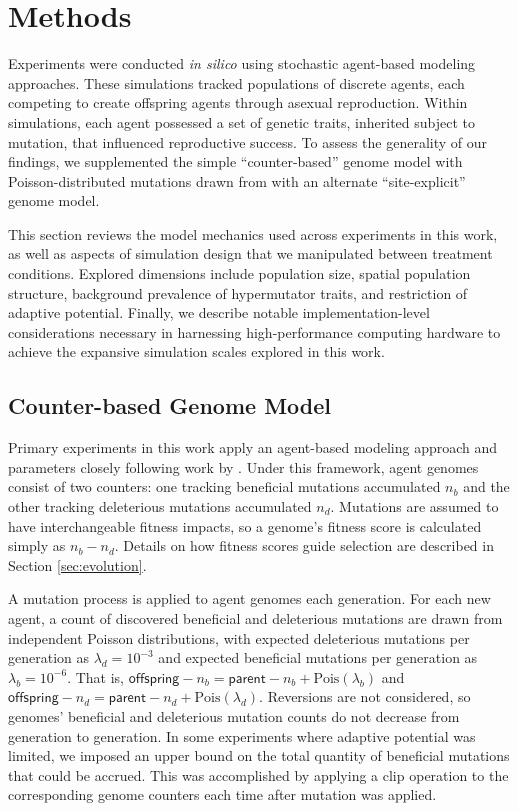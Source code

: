 \section{Methods} \label{sec:methods}

Experiments were conducted \textit{in silico} using stochastic agent-based modeling approaches.
These simulations tracked populations of discrete agents, each competing to create offspring agents through asexual reproduction.
Within simulations, each agent possessed a set of genetic traits, inherited subject to mutation, that influenced reproductive success.
To assess the generality of our findings, we supplemented the simple ``counter-based'' genome model with Poisson-distributed mutations drawn from \cite{raynes2018sign} with an alternate ``site-explicit'' genome model.

This section reviews the model mechanics used across experiments in this work, as well as aspects of simulation design that we manipulated between treatment conditions.
Explored dimensions include population size, spatial population structure, background prevalence of hypermutator traits, and restriction of adaptive potential.
Finally, we describe notable implementation-level considerations necessary in harnessing high-performance computing hardware to achieve the expansive simulation scales explored in this work.

\subsection{Counter-based Genome Model} \label{sec:poisson}

Primary experiments in this work apply an agent-based modeling approach and parameters closely following work by \cite{raynes2018sign}.
Under this framework, agent genomes consist of two counters: one tracking beneficial mutations accumulated $n_b$ and the other tracking deleterious mutations accumulated $n_d$.
Mutations are assumed to have interchangeable fitness impacts, so a genome’s fitness score is calculated simply as $n_b - n_d$.
Details on how fitness scores guide selection are described in Section \ref{sec:evolution}.

A mutation process is applied to agent genomes each generation.
For each new agent, a count of discovered beneficial and deleterious mutations are drawn from independent Poisson distributions, with expected deleterious mutations per generation as
$\lambda_d=10^{-3}$ and expected beneficial mutations per generation as $\lambda_b=10^{-6}$.
That is, $\mathsf{offspring-}n_b = \mathsf{parent-}n_b + \mathrm{Pois}(\lambda_b)$ and $\mathsf{offspring-}n_d = \mathsf{parent-}n_d + \mathrm{Pois}(\lambda_d)$.
Reversions are not considered, so genomes' beneficial and deleterious mutation counts do not decrease from generation to generation.
In some experiments where adaptive potential was limited, we imposed an upper bound on the total quantity of beneficial mutations that could be accrued.
This was accomplished by applying a clip operation to the corresponding genome counters each time after mutation was applied.

